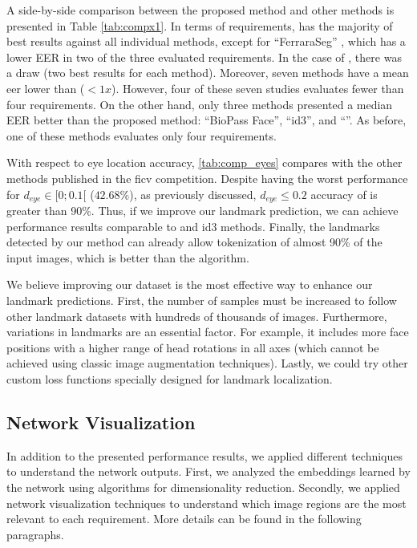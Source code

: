 

A side-by-side comparison between the proposed method and other methods is presented in Table \ref{tab:compx1}. In terms of requirements, \methodname has the majority of best results against all individual methods, except for ``FerraraSeg'' \citep{ferrara2012multi}, which has a lower EER in two of the three evaluated requirements. In the case of \citep{parente2016assessing}, there was a draw (two best results for each method). Moreover, seven methods have a mean \acs{eer} lower than \methodname ($< 1x$). However, four of these seven studies evaluates fewer than four requirements. On the other hand, only three methods presented a median EER better than the proposed method: ``BioPass Face'', ``id3'', and ``\citep{parente2016assessing}''. As before, one of these methods evaluates only four requirements.
 
With respect to eye location accuracy, \autoref{tab:comp_eyes} compares \methodname with the other methods published in the \acs{ficv} competition. Despite having the worst performance for $d_{eye} \in [0;0.1[$ ($42.68\%$), as previously discussed, $d_{eye} \leq 0.2$ accuracy of \methodname is greater than 90\%. Thus, if we improve our landmark prediction, we can achieve performance results comparable to \biopass and id3 methods. Finally, the landmarks detected by our method can already allow tokenization of almost 90\% of the input images, which is better than the \biotest algorithm.
 
We believe improving our dataset is the most effective way to enhance our landmark predictions. First, the number of samples must be increased to follow other landmark datasets with hundreds of thousands of images. Furthermore, variations in landmarks are an essential factor. For example, it includes more face positions with a higher range of head rotations in all axes (which cannot be achieved using classic image augmentation techniques). Lastly, we could try other custom loss functions specially designed for landmark localization.
 


\subsection{Network Visualization} \label{sec:netviz}
 
In addition to the presented performance results, we applied different techniques to understand the network outputs. First, we analyzed the embeddings learned by the network using algorithms for dimensionality reduction. Secondly, we applied network visualization techniques to understand which image regions are the most relevant to each requirement. More details can be found in the following paragraphs.
 
